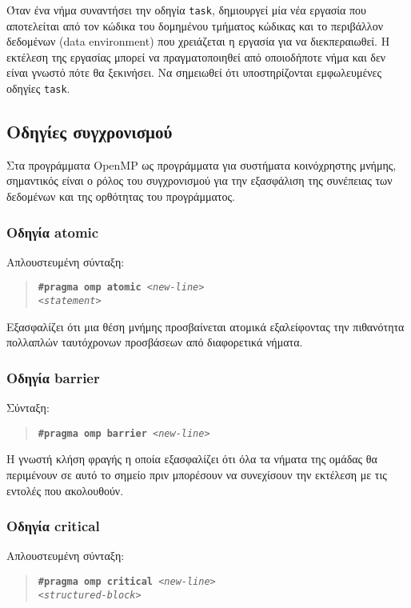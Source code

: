 Όταν ένα νήμα συναντήσει την οδηγία \texttt{task}, δημιουργεί μία νέα εργασία που αποτελείται από τον κώδικα του δομημένου τμήματος κώδικας και το περιβάλλον δεδομένων (data environment) που χρειάζεται η εργασία για να διεκπεραιωθεί. Η εκτέλεση της εργασίας μπορεί να πραγματοποιηθεί από οποιοδήποτε νήμα και δεν είναι γνωστό πότε θα ξεκινήσει. Να σημειωθεί ότι υποστηρίζονται εμφωλευμένες οδηγίες \texttt{task}.

\subsection{Οδηγίες συγχρονισμού}
Στα προγράμματα OpenMP ως προγράμματα για συστήματα κοινόχρηστης μνήμης, σημαντικός είναι ο ρόλος του συγχρονισμού για την εξασφάλιση της συνέπειας των δεδομένων και της ορθότητας του προγράμματος.

\subsubsection{Οδηγία atomic}
Απλουστευμένη σύνταξη:
\begin{quote}
	\texttt{\textbf{\#pragma omp atomic} \textit{<new-line>}} \\
		\texttt{\textit{<statement>}}
\end{quote}

Εξασφαλίζει ότι μια θέση μνήμης προσβαίνεται ατομικά εξαλείφοντας την πιθανότητα πολλαπλών ταυτόχρονων προσβάσεων από διαφορετικά νήματα.

\subsubsection{Οδηγία barrier}
Σύνταξη:
\begin{quote}
	\texttt{\textbf{\#pragma omp barrier} \textit{<new-line>}}
\end{quote}

Η γνωστή κλήση φραγής η οποία εξασφαλίζει ότι όλα τα νήματα της ομάδας θα περιμένουν σε αυτό το σημείο πριν μπορέσουν να συνεχίσουν την εκτέλεση με τις εντολές που ακολουθούν.

\subsubsection{Οδηγία critical}
Απλουστευμένη σύνταξη:
\begin{quote}
	\texttt{\textbf{\#pragma omp critical} \textit{<new-line>}} \\
		\texttt{\textit{<structured-block>}}
\end{quote}

